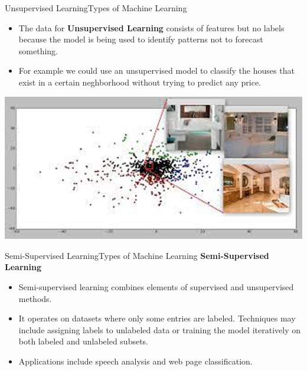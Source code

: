 \documentclass[11pt]{beamer}
\begin{document}
\begin{frame}{Unsupervised Learning}{Types of Machine Learning}
	\begin{itemize}
		\item The data for \textbf{Unsupervised Learning} consists of features but no labels because the model is being used to identify patterns not to forecast something. 
		\item For example we could use an unsupervised model to classify the houses that exist in a certain neghborhood without trying to predict any price.
	\end{itemize}
\begin{center}
\includegraphics[scale=.35]{../05-pictures/lesson-1-1_pic_23.png} 
\end{center}	
\end{frame}
\begin{frame}{Semi-Supervised Learning}{Types of Machine Learning}
\textbf{Semi-Supervised Learning}

	\begin{itemize}
		\item Semi-supervised learning combines elements of supervised and unsupervised methods. 

		\item It operates on datasets where only some entries are labeled. Techniques may include assigning labels to unlabeled data or training the model iteratively on both labeled and unlabeled subsets. 

		\item Applications include speech analysis and web page classification.

	\end{itemize}
\end{frame}
\end{document}
